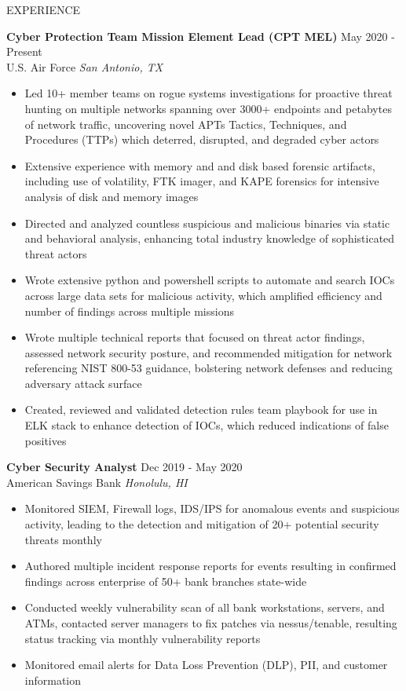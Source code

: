 \documentclass{resume} %
\begin{document}
\begin{rSection}{EXPERIENCE}

\textbf{Cyber Protection Team Mission Element Lead (CPT MEL)} \hfill May 2020 - Present\\ U.S. Air Force \hfill \textit{San Antonio, TX}
 \begin{itemize}
    \itemsep -3pt {} 
     \item Led 10+ member teams on rogue systems investigations for proactive threat hunting on multiple networks spanning over 3000+ endpoints and petabytes of network traffic, uncovering novel APTs Tactics, Techniques, and Procedures (TTPs) which deterred, disrupted, and degraded cyber actors
    \item Extensive experience with memory and and disk based forensic artifacts, including use of volatility, FTK imager, and KAPE forensics for intensive analysis of disk and memory images
    \item Directed and analyzed countless suspicious and malicious binaries via static and behavioral analysis, enhancing total industry knowledge of sophisticated threat actors
    \item Wrote extensive python and powershell scripts to automate and search IOCs across large data sets for malicious activity, which amplified efficiency and number of findings across multiple missions
    \item Wrote multiple technical reports that focused on threat actor findings, assessed network security posture, and recommended mitigation for network referencing NIST 800-53 guidance, bolstering network defenses and reducing adversary attack surface
    \item Created, reviewed and validated detection rules team playbook for use in ELK stack to enhance detection of IOCs, which reduced indications of false positives 
 \end{itemize}
 
\textbf{Cyber Security Analyst} \hfill Dec 2019 - May 2020\\
American Savings Bank \hfill \textit{Honolulu, HI}
 \begin{itemize}
    \itemsep -3pt {} 
     \item Monitored SIEM, Firewall logs, IDS/IPS for anomalous events and suspicious activity, leading to the detection and mitigation of 20+ potential security threats monthly
     \item Authored multiple incident response reports for events resulting in confirmed findings across enterprise of 50+ bank branches state-wide
     \item Conducted weekly vulnerability scan of all bank workstations, servers, and ATMs, contacted server managers to fix patches via nessus/tenable, resulting status tracking via monthly vulnerability reports
     \item Monitored email alerts for Data Loss Prevention (DLP), PII, and customer information
 \end{itemize}


\end{rSection}
\end{document}

